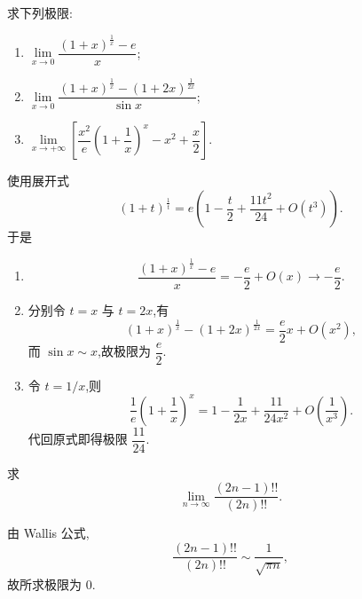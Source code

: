 \begin{example}
    求下列极限:
    \begin{enumerate}
        \item $\displaystyle
                  \lim\limits_{x\to0}
                  \dfrac{(1+x)^{\frac{1}{x}}-e}{x}$;
        \item $\displaystyle
                  \lim\limits_{x\to0}
                  \dfrac{(1+x)^{\frac{1}{x}}-(1+2x)^{\frac{1}{2x}}}{\sin x}$;
        \item $\displaystyle
                  \lim\limits_{x\to+\infty}
                  \left[
                      \dfrac{x^2}{e}\left(1+\dfrac{1}{x}\right)^x
                      -x^2+\dfrac{x}{2}
                      \right]$.
    \end{enumerate}
\end{example}
\exampleblank

\begin{solution}
    使用展开式
    \[
        (1+t)^{\frac{1}{t}}
        =e\left(1-\dfrac{t}{2}+\dfrac{11t^2}{24}+O(t^3)\right).
    \]
    于是
    \begin{enumerate}
        \item
              \[
                  \dfrac{(1+x)^{\frac{1}{x}}-e}{x}
                  =-\dfrac{e}{2}+O(x)\longrightarrow-\dfrac{e}{2}.
              \]
        \item 分别令 $t=x$ 与 $t=2x$,有
              \[
                  (1+x)^{\frac{1}{x}}-(1+2x)^{\frac{1}{2x}}
                  =\dfrac{e}{2}x+O(x^2),
              \]
              而 $\sin x\sim x$,故极限为 $\dfrac{e}{2}$.
        \item 令 $t=1/x$,则
              \[
                  \dfrac{1}{e}\left(1+\dfrac{1}{x}\right)^x
                  =1-\dfrac{1}{2x}+\dfrac{11}{24x^2}+O\left(\dfrac{1}{x^3}\right).
              \]
              代回原式即得极限 $\dfrac{11}{24}$.
    \end{enumerate}
\end{solution}

\begin{example}
    求
    \[
        \lim\limits_{n\to\infty}\dfrac{(2n-1)!!}{(2n)!!}.
    \]
\end{example}
\exampleblank

\begin{solution}
    由 Wallis 公式,
    \[
        \dfrac{(2n-1)!!}{(2n)!!}\sim\dfrac{1}{\sqrt{\pi n}},
    \]
    故所求极限为 $0$.
\end{solution}



